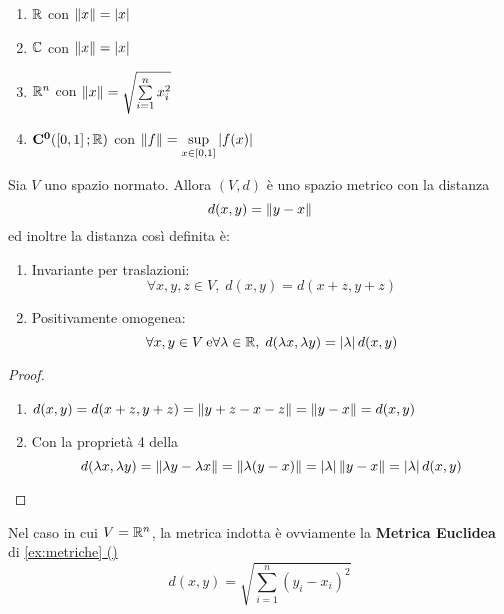 \begin{example}\leavevmode\vspace*{-\baselineskip}
	\begin{enumerate}
		\item $\mathbb{R}$ con $\left\|x\right\| = \left|x\right|$
		\item $\mathbb{C}$ con $\left\|x\right\| = \left|x\right|$
		\item $\mathbb{R}^n$ con $\left\|x\right\| = \sqrt{\sum\limits_{i=1}^{n}x_i^2}$
		\item $\mathbf{C^{0}}(\left[0,1\right];\mathbb{R})$ con $\left\|f\right\| = \sup\limits_{x \in \left[0,1\right]} \left|f(x)\right|$
	\end{enumerate}
\end{example}

\begin{proposition}
	\label{prop:dist_sp_norm}
	Sia $V$ uno spazio normato. Allora $(V,d)$ è uno spazio metrico con la distanza
	$$d(x,y) = \left\|y-x\right\|$$
	ed inoltre la distanza così definita è:
	\begin{enumerate}
		\item Invariante per traslazioni:
			$$\forall x,y,z \in V,\; d(x,y) = d(x+z, y+z)$$
		\item Positivamente omogenea:
			$$\forall x,y \in V\: \text{e} \forall \lambda \in \mathbb{R},\; d(\lambda x, \lambda y) = \left|\lambda\right|d(x,y)$$
	\end{enumerate}
	\begin{proof}
		~
		\begin{enumerate}
			\item $d(x,y) = d(x+z, y+z) = \left\|y+z-x-z\right\| = \left\|y-x\right\| = d(x,y)$
			\item Con la proprietà 4 della 
			$$d(\lambda x, \lambda y) = \left\|\lambda y - \lambda x\right\| = \left\|\lambda (y - x)\right\| = \left|\lambda\right| \left\|y - x\right\| = \left|\lambda\right|d(x,y)$$
		\end{enumerate}
	\end{proof}
	\begin{note}
		Nel caso in cui $V = \mathbb{R}^n$, la metrica indotta è ovviamente la \textbf{Metrica Euclidea} di \hyperref[ex:dist_eucl]{\cref*{ex:metriche} ()}
		$$d(x,y) = \sqrt{\sum\limits_{i=1}^{n} (y_i-x_i)^2 }$$
	\end{note}
\end{proposition}

